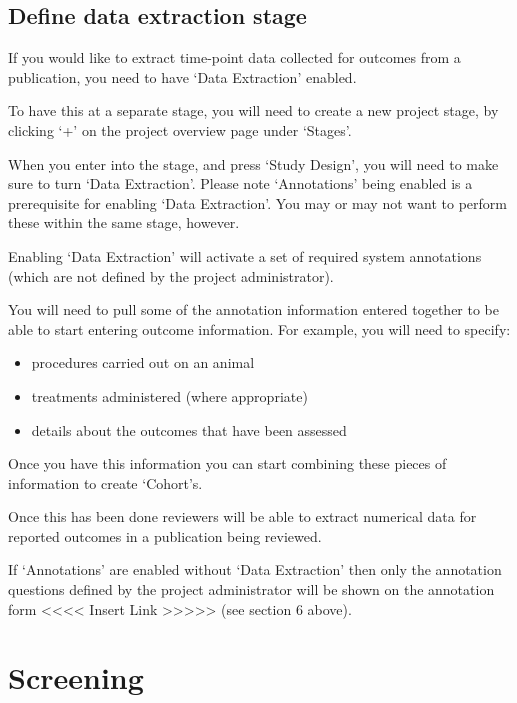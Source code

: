 \documentclass[
]{book}
\providecommand{\tightlist}{%
  \setlength{\itemsep}{0pt}\setlength{\parskip}{0pt}}
\begin{document}
\hypertarget{define-data-extraction-stage}{%
\section{Define data extraction stage}\label{define-data-extraction-stage}}

If you would like to extract time-point data collected for outcomes from a publication, you need to have `Data Extraction' enabled.

To have this at a separate stage, you will need to create a new project stage, by clicking `+' on the project overview page under `Stages'.

When you enter into the stage, and press `Study Design', you will need to make sure to turn `Data Extraction'. Please note `Annotations' being enabled is a prerequisite for enabling `Data Extraction'. You may or may not want to perform these within the same stage, however.

Enabling `Data Extraction' will activate a set of required system annotations (which are not defined by the project administrator).

You will need to pull some of the annotation information entered together to be able to start entering outcome information. For example, you will need to specify:

\begin{itemize}
\tightlist
\item
  procedures carried out on an animal
\item
  treatments administered (where appropriate)
\item
  details about the outcomes that have been assessed
\end{itemize}

Once you have this information you can start combining these pieces of information to create `Cohort's.

Once this has been done reviewers will be able to extract numerical data for reported outcomes in a publication being reviewed.

If `Annotations' are enabled without `Data Extraction' then only the annotation questions defined by the project administrator will be shown on the annotation form
\textless{}\textless{}\textless{}\textless{} Insert Link \textgreater{}\textgreater{}\textgreater{}\textgreater{}\textgreater{}
(see section 6 above).

\hypertarget{screening}{%
\chapter{Screening}\label{screening}}
\end{document}
